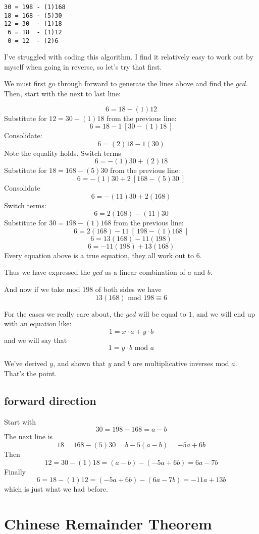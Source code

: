 \documentclass[11pt, oneside]{article}
\begin{document}
\begin{verbatim}
30 = 198 - (1)168
18 = 168 - (5)30
12 = 30  - (1)18
 6 = 18  - (1)12
 0 = 12  - (2)6
\end{verbatim}

I've struggled with coding this algorithm.  I find it relatively easy to work out by myself when going in reverse, so let's try that first.

We must first go through forward to generate the lines above and find the $gcd$.  Then, start with the next to last line:

\[ 6 = 18 - (1)12 \]
Substitute for $12 = 30 - (1)18$ from the previous line:
\[ 6 = 18 - 1 \ [ 30 - (1)18 \ ] \]
Consolidate:
\[ 6 = (2)18 - 1(30) \]
Note the equality holds.  Switch terms
\[ 6 = -(1)30 + (2)18 \]
Substitute for $18 = 168 - (5)30$ from the previous line:
\[ 6 = -(1)30 + 2 \ [ 168 - (5)30 \ ] \]
Consolidate
\[ 6 = -(11)30 + 2(168) \]
Switch terms:
\[ 6 = 2(168) -(11)30 \]
Substitute for $30 = 198 - (1)168$ from the previous line:
\[ 6 = 2(168) - 11 \ [ \ 198 - (1)168 \ ]  \]
\[ 6 = 13(168) - 11(198) \]
\[ 6 = - 11(198) + 13(168) \]
Every equation above is a true equation, they all work out to $6$.

Thus we have expressed the $gcd$ as a linear combination of $a$ and $b$.

And now if we take mod $198$ of both sides we have
\[ 13(168) \text{ mod } 198 \equiv 6 \]

For the cases we really care about, the $gcd$ will be equal to $1$, and we will end up with an equation like:
\[ 1 = x \cdot a + y \cdot b \]
and we will say that
\[ 1 = y \cdot b \text{ mod } a \]

We've derived $y$, and shown that $y$ and $b$ are multiplicative inverses mod $a$.  That's the point.

\subsection*{forward direction}

Start with
\[ 30 = 198 - 168 = a - b \]
The next line is
\[ 18 = 168 - (5)30 = b - 5(a - b) = -5a + 6b  \]
Then
\[ 12 = 30  - (1)18 = (a - b) - (-5a + 6b) = 6a - 7b \]
Finally
\[ 6 = 18  - (1)12 = (-5a + 6b) - (6a - 7b) = -11a + 13b \]
which is just what we had before.

\section*{Chinese Remainder Theorem}
\end{document}
